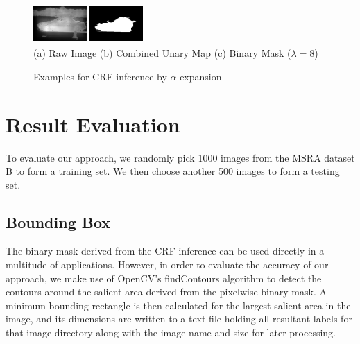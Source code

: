 \documentclass[10pt,twocolumn,letterpaper]{article}
\begin{document}
\begin{figure}[ht]
\begin{center}
    \includegraphics[width=0.8in,height=0.6in]{./Figures/CRFinference/5_162_162349_3.jpg}
    \includegraphics[width=0.8in,height=0.6in]{./Figures/CRFinference/5_162_162349_2.jpg} \\
    \footnotesize  (a) Raw Image (b) Combined Unary Map  (c) Binary Mask ($\lambda=8$)\\
     \caption{Examples for CRF inference by $\alpha$-expansion}
\end{center}
\end{figure}

\section{Result Evaluation}
To evaluate our approach, we randomly pick 1000 images from the MSRA dataset B to form a training set. We then choose another 500 images to form a testing set.

\subsection{Bounding Box}
The binary mask derived from the CRF inference can be used directly in a multitude of applications. However, in order to evaluate the accuracy of our approach, we make use of OpenCV's findContours algorithm \cite{topological} to detect the contours around the salient area derived from the pixelwise binary mask.  A minimum bounding rectangle is then calculated for the largest salient area in the image, and its dimensions are written to a text file holding all resultant labels for that image directory along with the image name and size for later processing.
\end{document}

